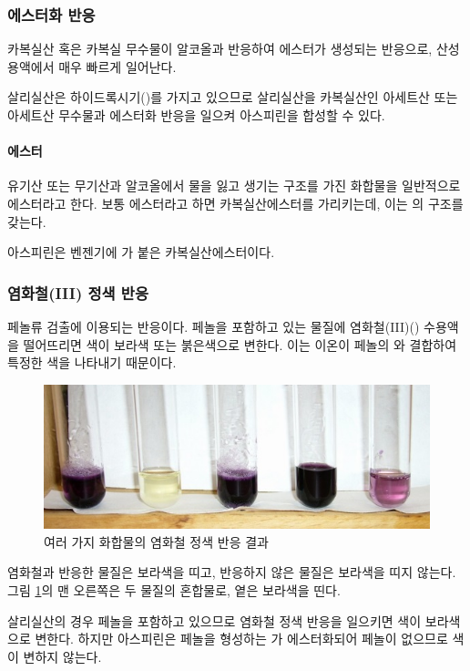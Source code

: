 \documentclass{GSHS-chemexp}
\begin{document}
	\subsubsection{에스터화 반응}
	카복실산 혹은 카복실 무수물이 알코올과 반응하여
	에스터가 생성되는 반응으로, 산성 용액에서 매우 빠르게 일어난다.
	
	살리실산은 하이드록시기()를 가지고 있으므로
	살리실산을 카복실산인 아세트산 또는 아세트산 무수물과
	에스터화 반응을 일으켜 아스피린을 합성할 수 있다.
	
	\paragraph{에스터}
	유기산 또는 무기산과 알코올에서
	물을 잃고 생기는 구조를 가진 화합물을 일반적으로 에스터라고 한다.
	보통 에스터라고 하면 카복실산에스터를 가리키는데,
	이는 의 구조를 갖는다.
	
	아스피린은 벤젠기에 가 붙은 카복실산에스터이다.
	
	\subsubsection{염화철(III) 정색 반응}
	페놀류 검출에 이용되는 반응이다. 페놀을 포함하고 있는 물질에
	염화철(III)() 수용액을 떨어뜨리면
	색이 보라색 또는 붉은색으로 변한다.
	이는  이온이 페놀의 와 결합하여
	특정한 색을 나타내기 때문이다.
	\begin{figure}[H]
		\centering
		\includegraphics[scale=1]{noname02.jpg}
		\caption{여러 가지 화합물의 염화철 정색 반응 결과}
		\label{fig:fe3}
	\end{figure}
	
	염화철과 반응한 물질은 보라색을 띠고,
	반응하지 않은 물질은 보라색을 띠지 않는다.
	그림 \ref{fig:fe3}의 맨 오른쪽은 두 물질의 혼합물로, 옅은 보라색을 띤다.
	
	살리실산의 경우 페놀을 포함하고 있으므로
	염화철 정색 반응을 일으키면 색이 보라색으로 변한다.
	하지만 아스피린은 페놀을 형성하는 가 에스터화되어
	페놀이 없으므로 색이 변하지 않는다.
	
\end{document}
